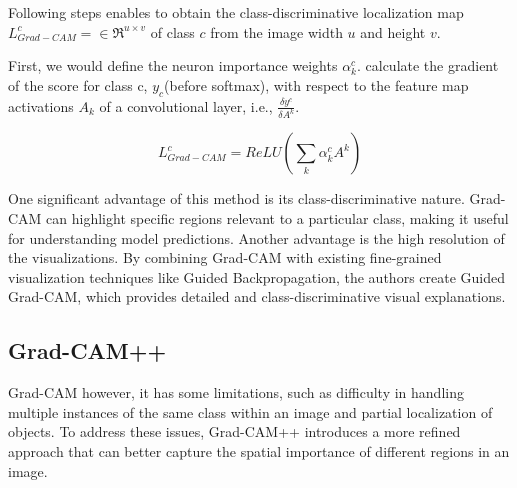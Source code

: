 Following steps enables to obtain the class-discriminative localization map $L^c_{Grad-CAM} = \in\Re^{u \times v}$ of class $c$ from the image width $u$ and height $v$. 

First, we would define the neuron importance weights $\alpha^c_k$. calculate the gradient of the score for class c, $y_c$(before softmax), with respect to the feature map activations $A_k$ of a convolutional layer, i.e., $\frac{\delta y^c}{\delta A^k}$. 
 
\begin{displaymath}
    L^c_{Grad-CAM} = ReLU(\sum_k\alpha^c_kA^k)
\end{displaymath}

One significant advantage of this method is its class-discriminative nature. Grad-CAM can highlight specific regions relevant to a particular class, making it useful for understanding model predictions. Another advantage is the high resolution of the visualizations. By combining Grad-CAM with existing fine-grained visualization techniques like Guided Backpropagation, the authors create Guided Grad-CAM, which provides detailed and class-discriminative visual explanations.

\subsection{Grad-CAM++}
Grad-CAM however, it has some limitations, such as difficulty in handling multiple instances of the same class within an image and partial localization of objects. To address these issues, Grad-CAM++ introduces a more refined approach that can better capture the spatial importance of different regions in an image. 